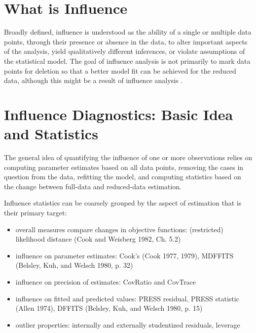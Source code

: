 \documentclass[12pt, a4paper]{report}
\theoremstyle{plain}
\theoremstyle{definition}
\theoremstyle{remark}
\begin{document}
\section{What is Influence} %


Broadly defined, influence is understood as the ability of a single or multiple data points, through their presence or absence in the data, to alter important aspects of the analysis, yield qualitatively different inferences, or violate assumptions of the statistical model. The goal of influence analysis is not primarily to mark data points for deletion so that a better model fit can be achieved for the reduced data, although this might be a result of influence analysis \citep{schabenberger}.




\section{Influence Diagnostics: Basic Idea and Statistics} %

The general idea of quantifying the influence of one or more observations relies on computing parameter estimates based on all data points, removing the cases in question from the data, refitting the model, and computing statistics based on the change between full-data and reduced-data estimation. 


Influence statistics can be coarsely grouped by the aspect of estimation that is their primary target:
\begin{itemize}
	\item overall measures compare changes in objective functions: (restricted) likelihood distance (Cook and Weisberg 1982, Ch. 5.2)
	\item influence on parameter estimates: Cook’s  (Cook 1977, 1979), MDFFITS (Belsley, Kuh, and Welsch 1980, p. 32)
	\item influence on precision of estimates: CovRatio and CovTrace
	\item influence on fitted and predicted values: PRESS residual, PRESS statistic (Allen 1974), DFFITS (Belsley, Kuh, and Welsch 1980, p. 15)
	\item outlier properties: internally and externally studentized residuals, leverage
\end{itemize}
\end{document}
